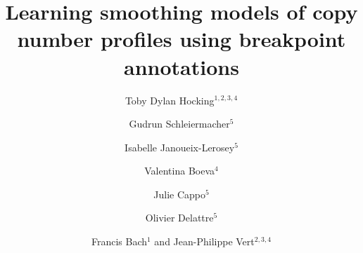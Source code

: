 \documentclass[10pt]{bmc_article}
\newenvironment{bmcformat}{\begin{raggedright}\baselineskip20pt\sloppy\setboolean{publ}{false}}{\end{raggedright}\baselineskip20pt\sloppy}
\begin{document}
\begin{bmcformat}



  \title{Learning smoothing models of copy number profiles using
    breakpoint annotations}
 


\author{Toby Dylan Hocking\correspondingauthor$^{1,2,3,4}$%
%
\and
Gudrun Schleiermacher$^5$%
%
\and
Isabelle Janoueix-Lerosey$^{5}$%
%
\and
Valentina Boeva$^{4}$%
%
\and
Julie Cappo$^{5}$%
%
\and
Olivier Delattre$^5$%
%
\and
Francis Bach$^1$%
and
Jean-Philippe Vert$^{2,3,4}$%
%
}
      


\address{%
  \iid(1) INRIA -- Sierra project-team, Paris, F-75013, France\\
  \iid(2) Centre for computational biology, Mines ParisTech,
  Fontainebleau, F-77300, France\\
  \iid(3) Institut Curie, Paris, France\\
  \iid(4) INSERM U900, Paris, F-75248, France\\
  \iid(5) INSERM U830, Paris, F-75248, France}%


\end{bmcformat}
\end{document}

